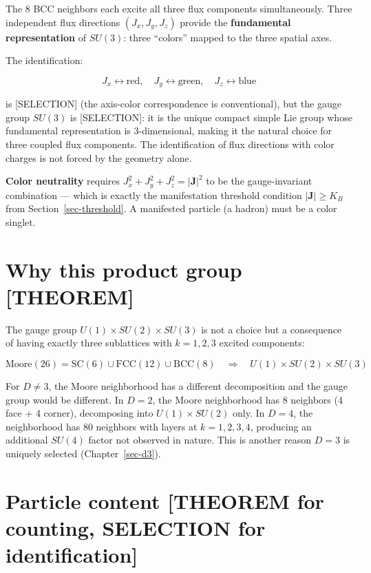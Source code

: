 \documentclass[
  11pt,
  letterpaper,
  twoside,
  openany]{book}
\makeatletter
\let\orig@section\section
\renewcommand{\section}{\needspace{8\baselineskip}\orig@section}
\makeatother
\begin{document}
The 8 BCC neighbors each excite all three flux components
simultaneously. Three independent flux directions \((J_x, J_y, J_z)\)
provide the \textbf{fundamental representation} of \(SU(3)\): three
``colors'' mapped to the three spatial axes.

The identification:

\[
J_x \leftrightarrow \text{red}, \quad J_y \leftrightarrow \text{green}, \quad J_z \leftrightarrow \text{blue}
\]

is {[}SELECTION{]} (the axis-color correspondence is conventional), but
the gauge group \(SU(3)\) is {[}SELECTION{]}: it is the unique compact
simple Lie group whose fundamental representation is 3-dimensional,
making it the natural choice for three coupled flux components. The
identification of flux directions with color charges is not forced by
the geometry alone.

\textbf{Color neutrality} requires
\(J_x^2 + J_y^2 + J_z^2 = |\mathbf{J}|^2\) to be the gauge-invariant
combination --- which is exactly the manifestation threshold condition
\(|\mathbf{J}| \geq K_B\) from Section~\ref{sec-threshold}. A manifested
particle (a hadron) must be a color singlet.

\section{Why this product group
{[}THEOREM{]}}\label{why-this-product-group-theorem}

The gauge group \(U(1) \times SU(2) \times SU(3)\) is not a choice but a
consequence of having exactly three sublattices with \(k = 1, 2, 3\)
excited components:

\[
\text{Moore}(26) = \text{SC}(6) \cup \text{FCC}(12) \cup \text{BCC}(8) \quad \Longrightarrow \quad U(1) \times SU(2) \times SU(3)
\]

For \(D \neq 3\), the Moore neighborhood has a different decomposition
and the gauge group would be different. In \(D = 2\), the Moore
neighborhood has 8 neighbors (4 face + 4 corner), decomposing into
\(U(1) \times SU(2)\) only. In \(D = 4\), the neighborhood has 80
neighbors with layers at \(k = 1, 2, 3, 4\), producing an additional
\(SU(4)\) factor not observed in nature. This is another reason
\(D = 3\) is uniquely selected (Chapter~\ref{sec-d3}).

\section{Particle content {[}THEOREM for counting, SELECTION for
identification{]}}\label{particle-content-theorem-for-counting-selection-for-identification}
\end{document}
